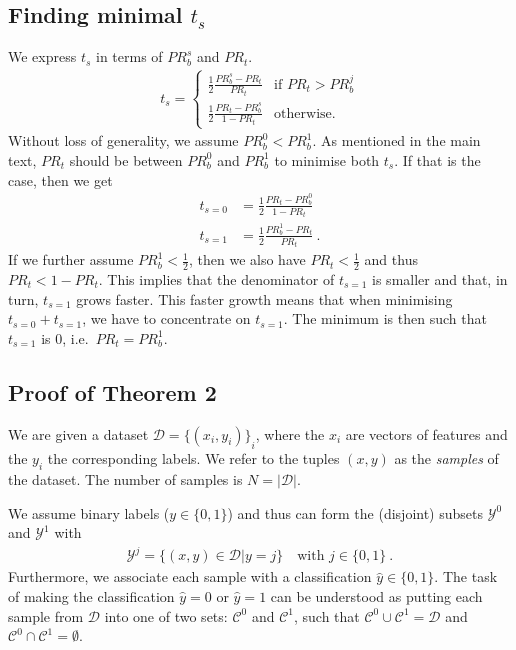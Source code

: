 \subsection{Finding minimal $t_s$}
We express $t_s$ in terms of $\mathit{PR}_b^s$ and $\mathit{PR}_t$.
\begin{align}
  t_s = \begin{cases}
    \frac{1}{2}\frac{\mathit{PR}_b^s - \mathit{PR}_t}{\mathit{PR}_t} &\text{if }\mathit{PR}_t>\mathit{PR}_b^j\\
    \frac{1}{2}\frac{\mathit{PR}_t - \mathit{PR}_b^s}{1 - \mathit{PR}_t} &\text{otherwise.}
  \end{cases}\label{eq:ts-pr2}
\end{align}
Without loss of generality, we assume $\mathit{PR}_b^0<\mathit{PR}_b^1$.
As mentioned in the main text, 
$\mathit{PR}_t$ should be between $\mathit{PR}_b^0$ and $\mathit{PR}_b^1$ to minimise both $t_s$.
If that is the case, then we get
\begin{align}
  t_{s=0} &= \frac{1}{2}\frac{\mathit{PR}_t - \mathit{PR}_b^0}{1 - \mathit{PR}_t}\\
  t_{s=1} &= \frac{1}{2}\frac{\mathit{PR}_b^1 - \mathit{PR}_t}{\mathit{PR}_t}~.
\end{align}
If we further assume $\mathit{PR}_b^1<\tfrac{1}{2}$,
then we also have $\mathit{PR}_t<\tfrac{1}{2}$ and thus $\mathit{PR}_t<1-\mathit{PR}_t$.
This implies that the denominator of $t_{s=1}$ is smaller and that, in turn, $t_{s=1}$ grows faster.
This faster growth means that when minimising $t_{s=0} + t_{s=1}$, we have to concentrate on $t_{s=1}$.
The minimum is then such that $t_{s=1}$ is 0, i.e.\ $\mathit{PR}_t=\mathit{PR}_b^1$.

\subsection{Proof of Theorem 2}
We are given a dataset $\mathcal{D} = {\{(x_i, y_i)\}}_i$,
where the $x_i$ are vectors of features and the $y_i$ the corresponding labels.
We refer to the tuples $(x, y)$ as the \emph{samples} of the dataset.
The number of samples is $N = |\mathcal{D}|$.

We assume binary labels ($y\in \{0, 1\}$) and thus can form the (disjoint) subsets $\mathcal{\mathcal{Y}}^0$ and $\mathcal{Y}^1$ with
\begin{align}
  \mathcal{Y}^j = \{(x, y)\in \mathcal{D}|y = j\}\quad\text{with } j\in\{0, 1\}~.
\end{align}
Furthermore, we associate each sample with a classification $\hat{y}\in \{0, 1\}$.
The task of making the classification $\hat{y}=0$ or $\hat{y}=1$ can be understood as putting each sample from $\mathcal{D}$
into one of two sets: $\mathcal{C}^0$ and $\mathcal{C}^1$,
such that $\mathcal{C}^0\cup\mathcal{C}^1 = \mathcal{D}$ and $\mathcal{C}^0\cap\mathcal{C}^1 = \emptyset$.

